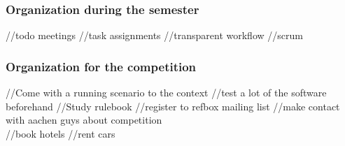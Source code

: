 \subsubsection{Organization during the semester}
 //todo meetings 
 //task assignments
 //transparent workflow
 //scrum 
 
 \subsubsection{Organization for the competition}
 //Come with a running scenario to the context
 //test a lot of the software beforehand
 //Study rulebook
 //register to refbox mailing list
 //make contact with aachen guys about competition \\
 
 //book hotels 
 //rent cars 

